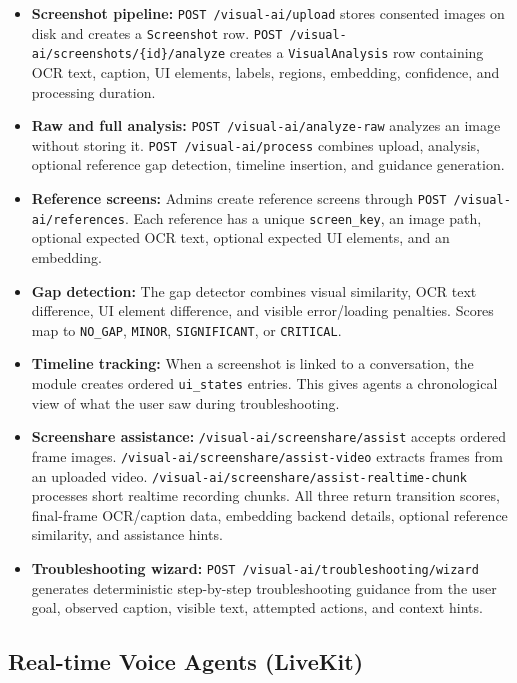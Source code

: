 \begin{itemize}
    \item \textbf{Screenshot pipeline:} \texttt{POST /visual-ai/upload} stores consented images on disk and creates a \texttt{Screenshot} row. \texttt{POST /visual-ai/screenshots/\{id\}/analyze} creates a \texttt{VisualAnalysis} row containing OCR text, caption, UI elements, labels, regions, embedding, confidence, and processing duration.
    \item \textbf{Raw and full analysis:} \texttt{POST /visual-ai/analyze-raw} analyzes an image without storing it. \texttt{POST /visual-ai/process} combines upload, analysis, optional reference gap detection, timeline insertion, and guidance generation.
    \item \textbf{Reference screens:} Admins create reference screens through \texttt{POST /visual-ai/references}. Each reference has a unique \texttt{screen\_key}, an image path, optional expected OCR text, optional expected UI elements, and an embedding.
    \item \textbf{Gap detection:} The gap detector combines visual similarity, OCR text difference, UI element difference, and visible error/loading penalties. Scores map to \texttt{NO\_GAP}, \texttt{MINOR}, \texttt{SIGNIFICANT}, or \texttt{CRITICAL}.
    \item \textbf{Timeline tracking:} When a screenshot is linked to a conversation, the module creates ordered \texttt{ui\_states} entries. This gives agents a chronological view of what the user saw during troubleshooting.
    \item \textbf{Screenshare assistance:} \texttt{/visual-ai/screenshare/assist} accepts ordered frame images. \texttt{/visual-ai/screenshare/assist-video} extracts frames from an uploaded video. \texttt{/visual-ai/screenshare/assist-realtime-chunk} processes short realtime recording chunks. All three return transition scores, final-frame OCR/caption data, embedding backend details, optional reference similarity, and assistance hints.
    \item \textbf{Troubleshooting wizard:} \texttt{POST /visual-ai/troubleshooting/wizard} generates deterministic step-by-step troubleshooting guidance from the user goal, observed caption, visible text, attempted actions, and context hints.
\end{itemize}

\subsection{Real-time Voice Agents (LiveKit)}


